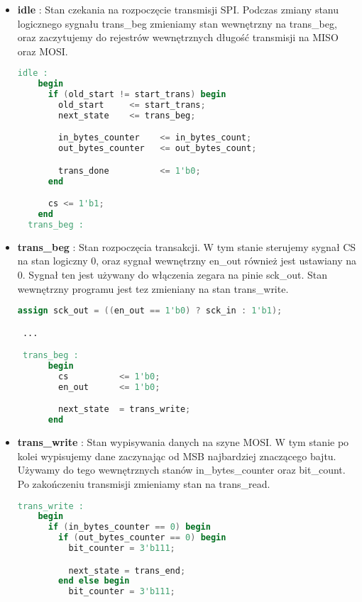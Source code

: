 \documentclass[a4paper,12pt]{article}
\begin{document}
\begin{itemize}
  \item \textbf{idle} : Stan czekania na rozpoczęcie transmisji SPI. Podczas zmiany stanu logicznego sygnału trans\_beg zmieniamy stan wewnętrzny na trans\_beg, oraz zaczytujemy do rejestrów wewnętrznych długość transmisji na MISO oraz MOSI.

\begin{lstlisting}[language=verilog]
 idle :
    begin
      if (old_start != start_trans) begin
        old_start     <= start_trans;
        next_state    <= trans_beg;

        in_bytes_counter    <= in_bytes_count;
        out_bytes_counter   <= out_bytes_count;

        trans_done          <= 1'b0;
      end

      cs <= 1'b1;
    end
  trans_beg :
\end{lstlisting}


  \item \textbf{trans\_beg} : Stan rozpoczęcia transakcji. W tym stanie sterujemy sygnał CS na stan logiczny 0, oraz sygnał wewnętrzny en\_out również jest ustawiany na 0. Sygnał ten jest używany do włączenia zegara na pinie sck\_out. Stan wewnętrzny programu jest tez zmieniany na stan trans\_write.

\begin{lstlisting}[language=verilog]
 assign sck_out = ((en_out == 1'b0) ? sck_in : 1'b1);

 ...

 trans_beg :
      begin
        cs          <= 1'b0;
        en_out      <= 1'b0;

        next_state  = trans_write;
      end
\end{lstlisting}

  \item \textbf{trans\_write} : Stan wypisywania danych na szyne MOSI. W tym stanie po kolei wypisujemy dane zaczynając od MSB najbardziej znaczącego bajtu. Używamy do tego wewnętrznych stanów in\_bytes\_counter oraz bit\_count. Po zakończeniu transmisji zmieniamy stan na trans\_read.

\begin{lstlisting}[language=verilog]
trans_write :
    begin
      if (in_bytes_counter == 0) begin
        if (out_bytes_counter == 0) begin
          bit_counter = 3'b111;

          next_state = trans_end;
        end else begin
          bit_counter = 3'b111;


\end{lstlisting}
\end{itemize}
\end{document}
